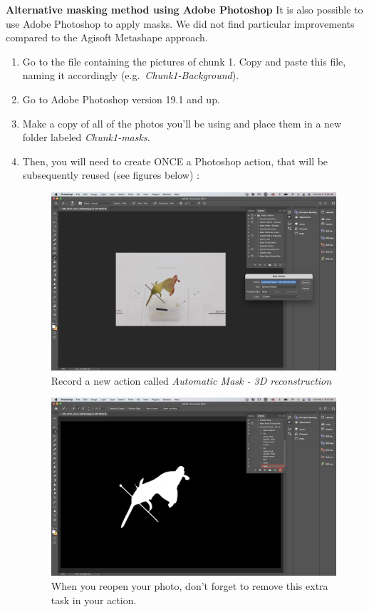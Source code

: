 \documentclass[
]{book}
\begin{document}
\textbf{Alternative masking method using Adobe Photoshop} It is also possible
to use Adobe Photoshop to apply masks. We did not find particular
improvements compared to the Agisoft Metashape approach.

\begin{enumerate}
\def\labelenumi{\arabic{enumi}.}
\item
  Go to the file containing the pictures of chunk 1. Copy and paste
  this file, naming it accordingly (e.g.~\emph{Chunk1-Background}).
\item
  Go to Adobe Photoshop version 19.1 and up.
\item
  Make a copy of all of the photos you'll be using and place them in a
  new folder labeled \emph{Chunk1-masks}.
\item
  Then, you will need to create ONCE a Photoshop action, that will be
  subsequently reused (see figures below) :

  \begin{figure}
  \centering
  \includegraphics{Figures/mask_1.png}
  \caption{Record a new action called \emph{Automatic Mask - 3D
  reconstruction}}
  \end{figure}

  \begin{figure}
  \centering
  \includegraphics{Figures/mask_2.png}
  \caption{When you reopen your photo, don't forget to remove this extra task
  in your action.}
  \end{figure}


\end{enumerate}
\end{document}
